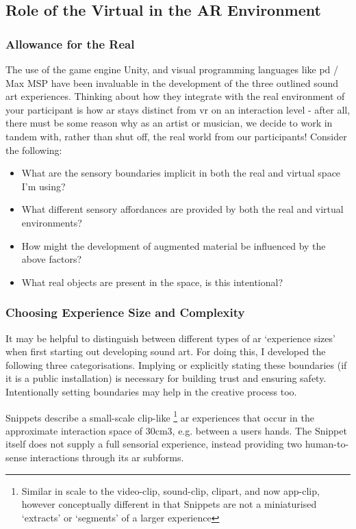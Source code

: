 \subsection{Role of the Virtual in the AR Environment}\label{sec: discussion-guidelines-environment}
\subsubsection{Allowance for the Real}
The use of the game engine Unity, and visual programming languages like \gls{pd} / Max MSP have been invaluable in the development of the three outlined sound \gls{art} experiences. Thinking about how they integrate with the real environment of your participant is how \gls{ar} stays distinct from \gls{vr} on an interaction level - after all, there must be some reason why as an artist or musician, we decide to work in tandem with, rather than shut off, the real world from our participants! Consider the following:
\begin{itemize}
    \item What are the sensory boundaries implicit in both the real and virtual space I'm using? 
    \item What different sensory affordances are provided by both the real and virtual environments? 
    \item How might the development of augmented material be influenced by the above factors?
    \item What real objects are present in the space, is this intentional?
\end{itemize}

\subsubsection{Choosing Experience Size and Complexity}
It may be helpful to distinguish between different types of \gls{ar} `experience sizes' when first starting out developing sound \gls{art}. For doing this, I developed the following three categorisations. Implying or explicitly stating these boundaries (if it is a public installation) is necessary for building trust and ensuring safety. Intentionally setting boundaries may help in the creative process too.

Snippets describe a small-scale clip-like \footnote{Similar in scale to the video-clip, sound-clip, clipart, and now app-clip, however conceptually different in that Snippets are not a miniaturised `extracts' or `segments' of a larger experience} \gls{ar} experiences that occur in the approximate interaction space of 30cm3, e.g. between a users hands. The Snippet itself does not supply a full sensorial experience, instead providing two human-to-sense interactions through its \gls{ar} subforms.

